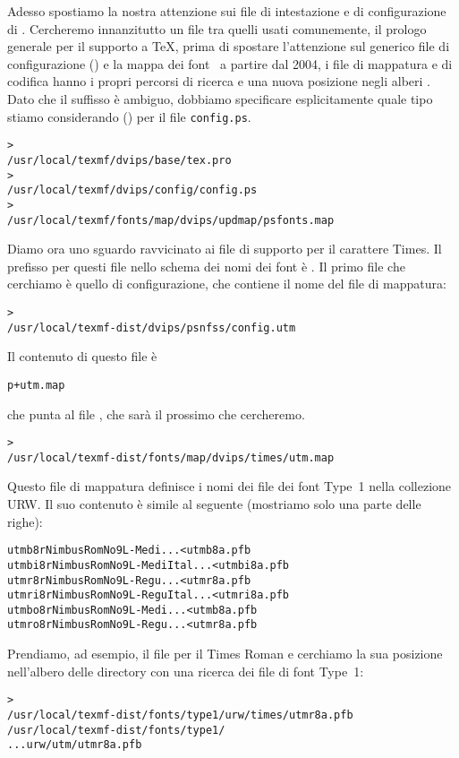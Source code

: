 \documentclass{article}
\begin{document}
Adesso spostiamo la nostra attenzione sui file di intestazione e di
configurazione di . Cercheremo innanzitutto un file tra
quelli usati comunemente, il prologo generale  per il
supporto a \TeX, prima di spostare l'attenzione sul generico file di
configurazione () e la mappa dei font \PS{}
 \Dash\ a partire dal 2004, i file di mappatura e di
codifica hanno i propri percorsi di ricerca e una nuova posizione negli
alberi . Dato che il suffisso  è ambiguo,
dobbiamo specificare esplicitamente quale tipo stiamo considerando
() per il file \texttt{config.ps}.
\begin{alltt}
> 
   /usr/local/texmf/dvips/base/tex.pro
> 
   /usr/local/texmf/dvips/config/config.ps
> 
   /usr/local/texmf/fonts/map/dvips/updmap/psfonts.map
\end{alltt}

Diamo ora uno sguardo ravvicinato ai file di supporto per il carattere
\PS{}  Times. Il prefisso per questi file nello schema dei nomi
dei font è . Il primo file che cerchiamo è quello di
configurazione, che contiene il nome del file di mappatura:
\begin{alltt}
> 
   /usr/local/texmf-dist/dvips/psnfss/config.utm
\end{alltt}
Il contenuto di questo file è
\begin{alltt}
  p +utm.map
\end{alltt}
che punta al file , che sarà il prossimo che cercheremo.
\begin{alltt}
> 
   /usr/local/texmf-dist/fonts/map/dvips/times/utm.map
\end{alltt}
Questo file di mappatura definisce i nomi dei file dei font \PS{} Type~1
nella collezione URW. Il suo contenuto è simile al seguente (mostriamo
solo una parte delle righe):
\begin{alltt}
utmb8r  NimbusRomNo9L-Medi    ... <utmb8a.pfb
utmbi8r NimbusRomNo9L-MediItal... <utmbi8a.pfb
utmr8r  NimbusRomNo9L-Regu    ... <utmr8a.pfb
utmri8r NimbusRomNo9L-ReguItal... <utmri8a.pfb
utmbo8r NimbusRomNo9L-Medi    ... <utmb8a.pfb
utmro8r NimbusRomNo9L-Regu    ... <utmr8a.pfb
\end{alltt}
Prendiamo, ad esempio, il file per il Times Roman  e
cerchiamo la sua posizione nell'albero delle directory  con
una ricerca dei file di font Type~1:
\begin{alltt}
> 
\ifSingleColumn   /usr/local/texmf-dist/fonts/type1/urw/times/utmr8a.pfb
\else   /usr/local/texmf-dist/fonts/type1/
... urw/utm/utmr8a.pfb
\fi\end{alltt}
\end{document}
